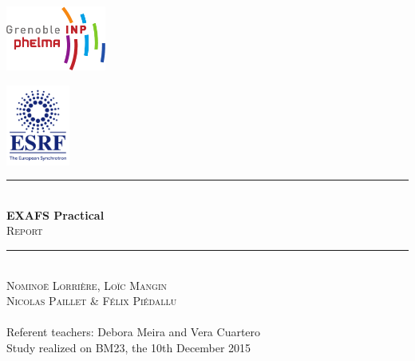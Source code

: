 \begin{titlepage}
    \vspace*{-10px}
    \includegraphics[height=80px]{Images/logo_phelma.pdf}
    \vspace*{-80px}
\begin{flushright}
    \vspace*{-30px}
    \includegraphics[height=100px]{Images/ESRF_logo.jpg}
\end{flushright}

\vspace*{0.5cm}
\begin{center}
\rule{\linewidth}{0.5mm}
    \\[0.4cm]
    {\huge \textbf{EXAFS Practical}}
    \\[0.4cm]
    {\huge \textsc{Report}}
    \\[0.4cm]
\rule{\linewidth}{0.5mm}
\\[1cm]

    \LARGE{\textsc{Nominoë Lorrière, Loïc Mangin\\ Nicolas Paillet \& Félix Piédallu}}
    \\[0.7cm]
    \large{~}%
    \\[1cm]

    \Large{Referent teachers: Debora Meira and Vera Cuartero}\\[1cm]

    \large{Study realized on BM23, the 10th December 2015}\\[2cm]


\end{center}
\end{titlepage}

\tableofcontents        %
\newpage
{}  %
